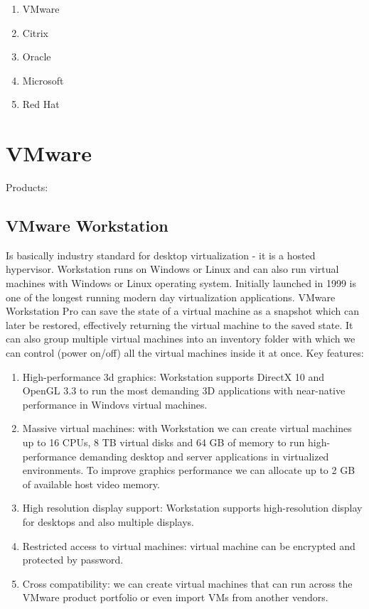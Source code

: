 \begin{enumerate}
\item VMware
\item Citrix
\item Oracle
\item Microsoft
\item Red Hat
\end{enumerate}

\section{VMware}

Products:
\subsection{VMware Workstation}
Is basically industry standard for desktop virtualization - it is a hosted hypervisor. Workstation runs on Windows or Linux and can also run virtual machines with Windows or Linux operating system. Initially launched in 1999 is one of the longest running modern day virtualization applications. VMware Workstation Pro can save the state of a virtual machine as a snapshot which can later be restored, effectively returning the virtual machine to the saved state. It can also group multiple virtual machines into an inventory folder with which we can control (power on/off) all the virtual machines inside it at once.
Key features:
\begin{enumerate}
\item High-performance 3d graphics: Workstation supports DirectX 10 and OpenGL 3.3 to run the most demanding 3D applications with near-native performance in Windovs virtual machines.
\item Massive virtual machines: with Workstation we can create virtual machines up to 16 CPUs, 8 TB virtual disks and 64 GB of memory to run high-performance demanding desktop and server applications in virtualized environments. To improve graphics performance we can allocate  up to 2 GB of available host video memory.
\item High resolution display support: Workstation supports high-resolution display for desktops and also multiple displays.
\item Restricted access to virtual machines: virtual machine can be encrypted and protected by password.
\item Cross compatibility: we can create virtual machines that can run across the VMware product portfolio or even import VMs from another vendors.
\end{enumerate}


